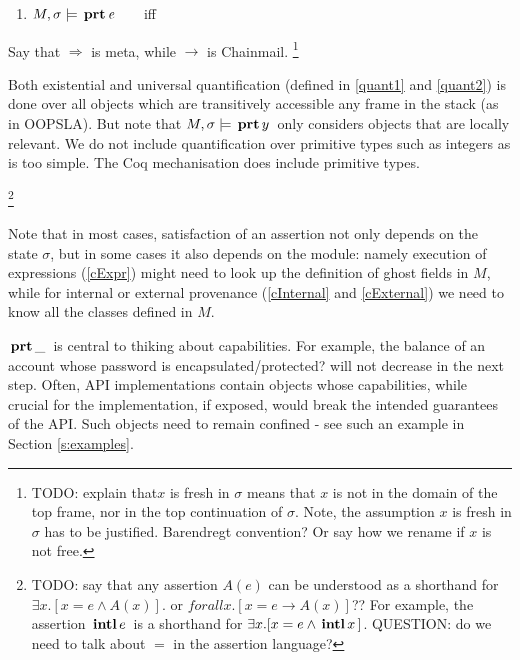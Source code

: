 \begin{enumerate}
\item
$M , \sigma \models {\ensuremath{\, \mathbf{prt}}\, \mathit{e}\, }$   \ \ \ iff \ \ \  
\end{enumerate}

Say that $\Longrightarrow$ is meta, while $\rightarrow$ is Chainmail.
\footnote{{TODO: explain that$x$ is fresh in $\sigma$  means that $x$ is not in the domain of the top frame, nor in the top continuation of $\sigma$.
 Note, the assumption $x$ is fresh in $\sigma$ has to be justified. Barendregt convention? Or say how we rename if $x$ is not free.}}

{Both existential and universal quantification (defined in \ref{quant1} and \ref{quant2}) is done over all objects which are transitively 
accessible any frame in the stack (as in OOPSLA). But note that $M , \sigma \models {\ensuremath{\, \mathbf{prt}}\, y\, }$ only considers objects that are locally relevant.
We do not include quantification over primitive types such as integers as \LangOO is too simple. The 
Coq mechanisation does include primitive types.}
 
\footnote{{TODO: say that any assertion $A(e)$ can be understood as a shorthand for $\exists x. [ x=e \wedge A(x)]$. or  $forall x. [ x=e \rightarrow A(x)]$?? For example, the  assertion   ${{\, \mathbf{intl}\, e\, }}$ is a shorthand for $\exists x. [ x=e \wedge {{\ensuremath{\, \mathbf{intl}}\, x\, }}]$. QUESTION: do we need to talk about $=$ in the assertion language?}}

 Note that in most cases, satisfaction of an assertion not only depends on the state $\sigma$, but 
in some cases it also depends on the module: namely execution of expressions (\ref{cExpr}) might need to look up the definition of ghost fields  in $M$, while 
for internal or external provenance (\ref{cInternal} and \ref{cExternal}) we need to know all the classes defined in $M$.


${{\, \mathbf{prt}\, \_\, }}$  is central to thiking about capabilities. For example, the balance of an account whose
  password is  encapsulated/protected?  will not decrease in the next step.
  Often, API implementations contain objects whose capabilities, while  crucial for the implementation, if exposed,
would break the intended guarantees of the API. Such objects need to remain confined - see
such an example in Section \ref{s:examples}. 

